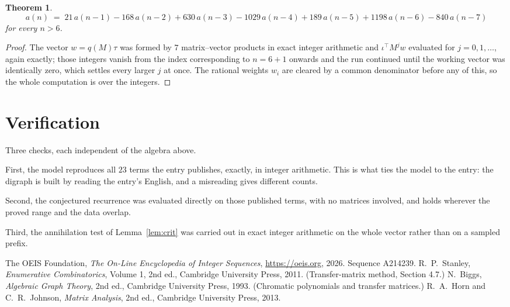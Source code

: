 \documentclass[11pt,a4paper]{article}
\theoremstyle{plain}
\newtheorem{theorem}{Theorem}
\theoremstyle{definition}
\begin{document}
\begin{theorem}
\[
a(n)\;=\;21\,a(n-1) - 168\,a(n-2) + 630\,a(n-3) - 1029\,a(n-4) + 189\,a(n-5) + 1198\,a(n-6) - 840\,a(n-7)
\]
for every $n>6$.
\end{theorem}

\begin{proof}
The vector $w=q(M)\tau$ was formed by $7$ matrix--vector products in exact integer
arithmetic and $\iota^{\!\top}M^{j}w$ evaluated for $j=0,1,\dots$, again exactly; those
integers vanish from the index corresponding to $n=6+1$ onwards and the run continued
until the working vector was identically zero, which settles every larger $j$ at once. The
rational weights $w_i$ are cleared by a common denominator before any of this, so the whole
computation is over the integers.
\end{proof}

\section{Verification}

Three checks, each independent of the algebra above.

First, the model reproduces all $23$ terms the entry publishes, exactly, in integer
arithmetic. This is what ties the model to the entry: the digraph is built by reading the
entry's English, and a misreading gives different counts.

Second, the conjectured recurrence was evaluated directly on those published terms, with no
matrices involved, and holds wherever the proved range and the data overlap.

Third, the annihilation test of Lemma~\ref{lem:crit} was carried out in exact integer
arithmetic on the whole vector rather than on a sampled prefix.

\begin{thebibliography}{9}
 The OEIS Foundation, \emph{The On-Line Encyclopedia of Integer
Sequences}, \url{https://oeis.org}, 2026. Sequence A214239.
 R.~P.~Stanley, \emph{Enumerative Combinatorics}, Volume 1, 2nd ed.,
Cambridge University Press, 2011. (Transfer-matrix method, Section 4.7.)
 N.~Biggs, \emph{Algebraic Graph Theory}, 2nd ed., Cambridge University
Press, 1993. (Chromatic polynomials and transfer matrices.)
 R.~A.~Horn and C.~R.~Johnson, \emph{Matrix Analysis}, 2nd ed., Cambridge
University Press, 2013.
\end{thebibliography}
\end{document}
